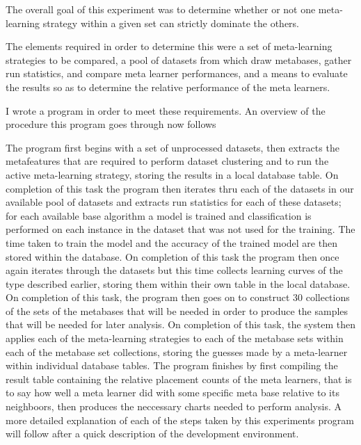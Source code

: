 The overall goal of this experiment was to determine whether or not one
meta-learning strategy within a given set can strictly dominate the others.

The elements required in order to determine this were a set of meta-learning
strategies to be compared, a pool of datasets from which draw metabases, gather
run statistics, and compare meta learner performances, and a means to evaluate
the results so as to determine the relative performance of the meta learners.

I wrote a program in order to meet these requirements.
An overview of the procedure this program goes through now follows

The program first begins with a set of unprocessed datasets, then extracts the
metafeatures that are required to perform dataset clustering and to run the
active meta-learning strategy, storing the results in a local database table.
On completion of this task the program then iterates thru each of the datasets
in our available pool of datasets and extracts run statistics for each of these
datasets; for each available base algorithm a model is trained and
classification is performed on each instance in the dataset that was not used
for the training. The time taken to train the model and the accuracy of the
trained model are then stored within the database. On completion of this task
the program then once again iterates through the datasets but this time collects
learning curves of the type described earlier, storing them within their own
table in the local database. On completion of this task, the program then goes on
to construct 30 collections of the sets of the metabases that will be needed in
order to produce the samples that will be needed for later analysis. On
completion of this task, the system then applies each of the meta-learning
strategies to each of the metabase sets within each of the metabase set
collections, storing the guesses made by a meta-learner within individual
database tables. The program finishes by first compiling the result table
containing the relative placement counts of the meta learners, that is to say
how well a meta learner did with some specific meta base relative to its
neighboors, then produces the neccessary charts needed to perform analysis.
A more detailed explanation of each of the steps taken by this experiments
program will follow after a quick description of the development environment.

